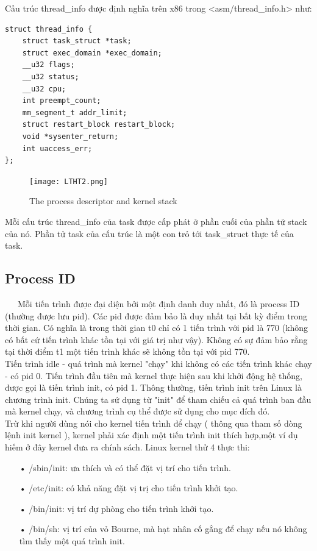 \documentclass[a4paper,10pt]{report}
\begin{document}
Cấu trúc thread\_info được định nghĩa trên x86 trong <asm/thread\_info.h> như:
\begin{lstlisting}
struct thread_info {
	struct task_struct *task;
	struct exec_domain *exec_domain;
	__u32 flags;
	__u32 status;
	__u32 cpu;
	int preempt_count;
	mm_segment_t addr_limit;
	struct restart_block restart_block;
	void *sysenter_return;
	int uaccess_err;
};
\end{lstlisting}
\begin{figure}[h]
\begin{center}
\texttt{[image: LTHT2.png]}
\caption{The process descriptor and kernel stack}
\end{center}
\end{figure}
Mỗi cấu trúc thread\_info của task được cấp phát ở phần cuối của phần tử stack của nó. Phần tử task của cấu trúc là một con trỏ tới task\_struct thực tế của task.
\subsection{Process ID}
\ \ \ Mỗi tiến trình được đại diện bởi một định danh duy nhất, đó là process ID (thường được lưu pid). Các pid được đảm bảo là duy nhất tại bất kỳ điểm trong thời gian. Có nghĩa là trong thời gian t0 chỉ có 1 tiến trình với pid là 770 (không có bất cứ tiến trình khác tồn tại với giá trị như vậy). Không có sự đảm bảo rằng tại thời điểm t1 một tiến trình khác sẽ không tồn tại với pid 770. \\

Tiến trình idle - quá trình mà kernel "chạy" khi không có các tiến trình khác chạy - có pid 0. Tiến trình đầu tiên mà kernel thực hiện sau khi khởi động hệ thống, được gọi là tiến trình init, có pid 1. Thông thường, tiến trình init trên Linux là chương trình init. Chúng ta sử dụng từ "init" để tham chiếu cả quá trình ban đầu mà kernel chạy, và chương trình cụ thể được sử dụng cho mục đích đó. \\

Trừ khi người dùng nói cho kernel tiến trình để chạy ( thông qua tham số dòng lệnh init kernel ), kernel phải xác định một tiến trình init thích hợp,một ví dụ hiếm ở đây kernel đưa ra chính sách. Linux kernel thử 4 thực thi:
\begin{itemize}
\item[•] /sbin/init:  ưa thích và có thể đặt vị trí cho tiến trình.
\item[•] /etc/init:    có khả năng đặt vị trị cho tiến trình khởi tạo.
\item[•] /bin/init:    vị trí dự phòng cho tiến trình khởi tạo.
\item[•] /bin/sh:     vị trí của vỏ Bourne, mà hạt nhân cố gắng để chạy nếu nó không tìm thấy một quá trình init.
\end{itemize}
\end{document}
